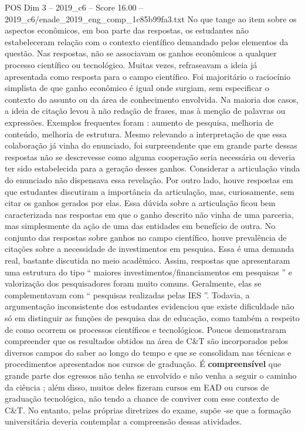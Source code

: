 \begin{textsample}{POS Dim 3 – 2019\_c6 – Score 16.00 – 2019\_c6/enade\_2019\_eng\_comp\_1c85b99fa3.txt}
No que tange ao item sobre os aspectos econômicos, em boa parte das respostas, os estudantes não estabeleceram relação com o contexto científico demandado pelos elementos da questão.
Nas respostas, não se associavam os ganhos econômicos a qualquer processo científico ou tecnológico.
Muitas vezes, refraseavam a ideia já apresentada como resposta para o campo científico.
Foi majoritário o raciocínio simplista de que ganho econômico é igual onde surgiam, sem especificar o contexto do assunto ou da área de conhecimento envolvida.
Na maioria dos casos, a ideia de citação levou à não redação de frases, mas à menção de palavras ou expressões.
Exemplos frequentes foram : aumento de pesquisa, melhoria de conteúdo, melhoria de estrutura.
Mesmo relevando a interpretação de que essa colaboração já vinha do enunciado, foi surpreendente que em grande parte dessas respostas não se descrevesse como alguma cooperação seria necessária ou deveria ter sido estabelecida para a geração desses ganhos.
Considerar a articulação vinda do enunciado não dispensava essa revelação.
Por outro lado, houve respostas em que estudantes discutiram a importância da articulação, mas, curiosamente, sem citar os ganhos gerados por elas.
Essa dúvida sobre a articulação ficou bem caracterizada nas respostas em que o ganho descrito não vinha de uma parceria, mas simplesmente da ação de uma das entidades em benefício de outra.
No conjunto das respostas sobre ganhos no campo científico, houve prevalência de citações sobre a necessidade de investimentos em pesquisa.
Essa é uma demanda real, bastante discutida no meio acadêmico.
Assim, respostas que apresentaram uma estrutura do tipo “ maiores investimentos/financiamentos em pesquisas ” e valorização dos pesquisadores foram muito comuns.
Geralmente, elas se complementavam com “ pesquisas realizadas pelas IES ”.
Todavia, a argumentação inconsistente dos estudantes evidenciou que existe dificuldade não só em distinguir as funções de pesquisa das de educação, como também a respeito de como ocorrem os processos científicos e tecnológicos.
Poucos demonstraram compreender que os resultados obtidos na área de C\&T são incorporados pelos diversos campos do saber ao longo do tempo e que se consolidam nas técnicas e procedimentos apresentados nos cursos de graduação.
É \textbf{compreensível} que grande parte dos egressos não tenha se envolvido e não venha a seguir o caminho da ciência ; além disso, muitos deles fizeram cursos em EAD ou cursos de graduação tecnológica, não tendo a chance de conviver com esse contexto de C\&T.
No entanto, pelas próprias diretrizes do exame, supõe -se que a formação universitária deveria contemplar a compreensão dessas atividades.

\end{textsample}
